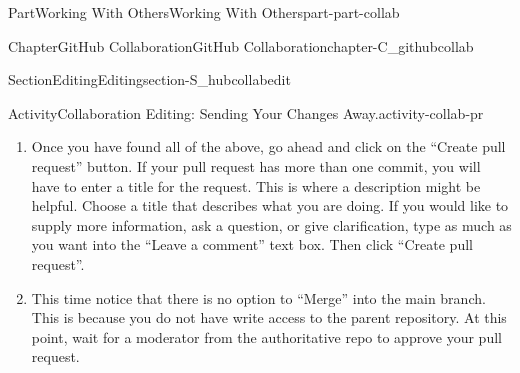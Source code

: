 \documentclass[twoside,10pt,]{book}
\newcommand{\xreffont}{\relax}
\newcommand{\mono}[1]{\texttt{#1}}
\newcommand{\terminology}[1]{\textbf{#1}}
\begin{document}
\begin{partptx}{Part}{Working With Others}{}{Working With Others}{}{}{part-part-collab}
\begin{chapterptx}{Chapter}{GitHub Collaboration}{}{GitHub Collaboration}{}{}{chapter-C_githubcollab}
\begin{sectionptx}{Section}{Editing}{}{Editing}{}{}{section-S_hubcollabedit}
\begin{activity}{Activity}{Collaboration Editing: Sending Your Changes Away.}{activity-collab-pr}
\begin{enumerate}[font=\bfseries,label=(\alph*),ref=\alph*]
\begin{enumerate}
\item{}There is a dialog box indicating which branches are being merged. There are more boxes than before. There should be four, allowing you to specify which repo and branch to want to merge from and which repo and branch you want to merge to. Usually GitHub gets it right, but not always, so check to make sure these are what you want.%
\par
The \terminology{base repository} is the repo you are merging to (here, the authoritative repo), the \terminology{head repository} is the repo you are merging from (here, your fork). The base branch is the specific branch you are merging to (often \mono{main}) and the compare branch is the branch from your fork you are merging from (often \mono{main} for me personally).%
\item{}After these boxes is, hopefully, a green checkmark and an ``Able to merge'' message. This is what you want. You might also get a red message about conflicts or other messages. In this case, you might have a merge conflict and will need to do some extra work. See \hyperref[section-S_mergeconflict]{Section~{\xreffont\ref{section-S_mergeconflict}}, p.\,\pageref{section-S_mergeconflict}}.%
\item{}There is a summary of all the commits made on the branch (with their commit messages)%
\item{}There is info on all of your specific changes in each file%
\end{enumerate}
%
\item{}Once you have found all of the above, go ahead and click on the ``Create pull request'' button. If your pull request has more than one commit, you will have to enter a title for the request. This is where a description might be helpful. Choose a title that describes what you are doing. If you would like to supply more information, ask a question, or give clarification, type as much as you want into the ``Leave a comment'' text box. Then click ``Create pull request''.%
\item{}This time notice that there is no option to ``Merge'' into the main branch. This is because you do not have write access to the parent repository. At this point, wait for a moderator from the authoritative repo to approve your pull request.%
\end{enumerate}%
\end{activity}%

\end{sectionptx}
\end{chapterptx}
\end{partptx}
\end{document}
